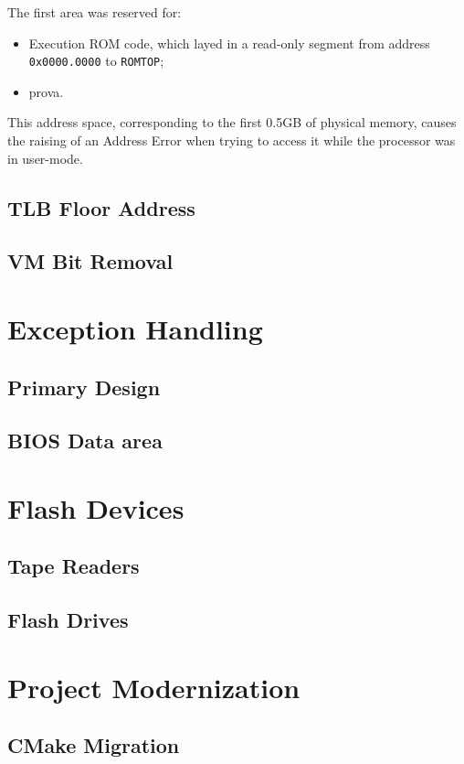 \documentclass[12pt,a4paper,openright,twoside]{report}
\begin{document}
	The first area was reserved for:
	\begin{itemize}  
	\item Execution ROM code, which layed in a read-only segment from address \texttt{0x0000.0000} to \texttt{ROMTOP};
	\item prova.
	\end{itemize}
	This address space, corresponding to the first 0.5GB of physical memory, causes the raising of an Address Error when trying to access it while the processor was in user-mode.
\section{TLB Floor Address}
\section{VM Bit Removal}
\chapter{Exception Handling}
\lhead[\fancyplain{}{\bfseries\thepage}]{\fancyplain{}{\bfseries\rightmark}}
\section{Primary Design}
\section{BIOS Data area}
\lhead[\fancyplain{}{\bfseries\thepage}]{\fancyplain{}{\bfseries\rightmark}}
\chapter{Flash Devices}
\lhead[\fancyplain{}{\bfseries\thepage}]{\fancyplain{}{\bfseries\rightmark}}
\section{Tape Readers}
\section{Flash Drives}
\chapter{Project Modernization}
\lhead[\fancyplain{}{\bfseries\thepage}]{\fancyplain{}{\bfseries\rightmark}}
\section{CMake Migration}
\end{document}
